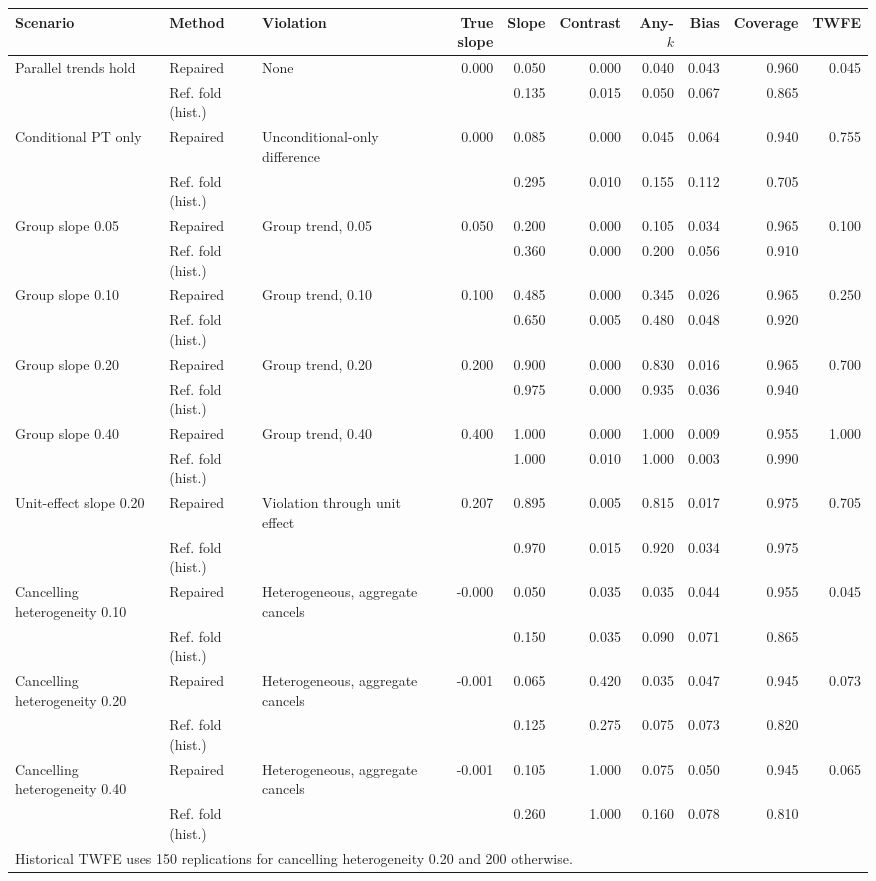\begin{tabular}{lllr rrr r r r}
\toprule
Scenario & Method & Violation & True slope & Slope & Contrast & Any-$k$ & Bias & Coverage & TWFE \\
\midrule
Parallel trends hold & Repaired & None & 0.000 & 0.050 & 0.000 & 0.040 & 0.043 & 0.960 & 0.045 \\
 & Ref. fold (hist.) &  &  & 0.135 & 0.015 & 0.050 & 0.067 & 0.865 &  \\
\addlinespace[2pt]
Conditional PT only & Repaired & Unconditional-only difference & 0.000 & 0.085 & 0.000 & 0.045 & 0.064 & 0.940 & 0.755 \\
 & Ref. fold (hist.) &  &  & 0.295 & 0.010 & 0.155 & 0.112 & 0.705 &  \\
\addlinespace[2pt]
Group slope 0.05 & Repaired & Group trend, 0.05 & 0.050 & 0.200 & 0.000 & 0.105 & 0.034 & 0.965 & 0.100 \\
 & Ref. fold (hist.) &  &  & 0.360 & 0.000 & 0.200 & 0.056 & 0.910 &  \\
\addlinespace[2pt]
Group slope 0.10 & Repaired & Group trend, 0.10 & 0.100 & 0.485 & 0.000 & 0.345 & 0.026 & 0.965 & 0.250 \\
 & Ref. fold (hist.) &  &  & 0.650 & 0.005 & 0.480 & 0.048 & 0.920 &  \\
\addlinespace[2pt]
Group slope 0.20 & Repaired & Group trend, 0.20 & 0.200 & 0.900 & 0.000 & 0.830 & 0.016 & 0.965 & 0.700 \\
 & Ref. fold (hist.) &  &  & 0.975 & 0.000 & 0.935 & 0.036 & 0.940 &  \\
\addlinespace[2pt]
Group slope 0.40 & Repaired & Group trend, 0.40 & 0.400 & 1.000 & 0.000 & 1.000 & 0.009 & 0.955 & 1.000 \\
 & Ref. fold (hist.) &  &  & 1.000 & 0.010 & 1.000 & 0.003 & 0.990 &  \\
\addlinespace[2pt]
Unit-effect slope 0.20 & Repaired & Violation through unit effect & 0.207 & 0.895 & 0.005 & 0.815 & 0.017 & 0.975 & 0.705 \\
 & Ref. fold (hist.) &  &  & 0.970 & 0.015 & 0.920 & 0.034 & 0.975 &  \\
\addlinespace[2pt]
Cancelling heterogeneity 0.10 & Repaired & Heterogeneous, aggregate cancels & -0.000 & 0.050 & 0.035 & 0.035 & 0.044 & 0.955 & 0.045 \\
 & Ref. fold (hist.) &  &  & 0.150 & 0.035 & 0.090 & 0.071 & 0.865 &  \\
\addlinespace[2pt]
Cancelling heterogeneity 0.20 & Repaired & Heterogeneous, aggregate cancels & -0.001 & 0.065 & 0.420 & 0.035 & 0.047 & 0.945 & 0.073 \\
 & Ref. fold (hist.) &  &  & 0.125 & 0.275 & 0.075 & 0.073 & 0.820 &  \\
\addlinespace[2pt]
Cancelling heterogeneity 0.40 & Repaired & Heterogeneous, aggregate cancels & -0.001 & 0.105 & 1.000 & 0.075 & 0.050 & 0.945 & 0.065 \\
 & Ref. fold (hist.) &  &  & 0.260 & 1.000 & 0.160 & 0.078 & 0.810 &  \\
\multicolumn{10}{l}{\footnotesize Historical TWFE uses 150 replications for cancelling heterogeneity 0.20 and 200 otherwise.} \\
\bottomrule
\end{tabular}
